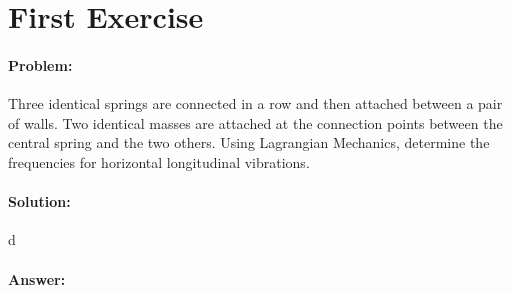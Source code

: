 \section{First Exercise}
\paragraph{Problem:} Three identical springs are connected in a row and then attached between a pair of walls. Two identical masses are attached at the connection points between the central spring and the two others. Using Lagrangian Mechanics, determine the frequencies for horizontal longitudinal vibrations.

\paragraph{Solution:} 
d
\paragraph{Answer:}